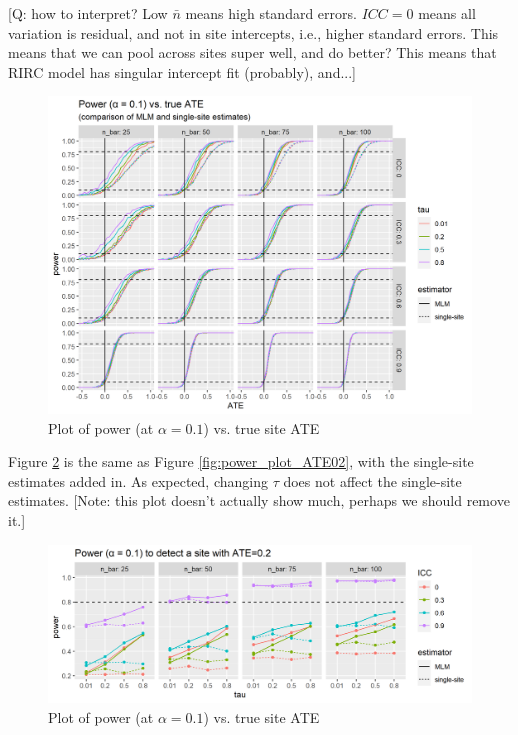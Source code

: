 \documentclass[]{article}
\begin{document}
[Q: how to interpret? Low $\bar{n}$ means high standard errors. $ICC=0$ means all variation is residual, and not in site intercepts, i.e., higher standard errors.
This means that we can pool across sites super well, and do better?
This means that RIRC model has singular intercept fit (probably), and...]

\begin{figure}[ht]
	\centering
	\includegraphics[width=\textwidth]{power_plot_comp}
	\caption{Plot of power (at $\alpha = 0.1$) vs. true site ATE}
	\label{fig:power_plot_comp}
\end{figure}

Figure \ref{fig:power_plot_comp_ATE02} is the same as Figure \ref{fig:power_plot_ATE02}, with the single-site estimates added in.
As expected, changing $\tau$ does not affect the single-site estimates.
[Note: this plot doesn't actually show much, perhaps we should remove it.]

\begin{figure}[ht]
	\centering
	\includegraphics[width=\textwidth]{power_plot_comp_ATE02}
	\caption{Plot of power (at $\alpha = 0.1$) vs. true site ATE}
	\label{fig:power_plot_comp_ATE02}
\end{figure}
\end{document}
